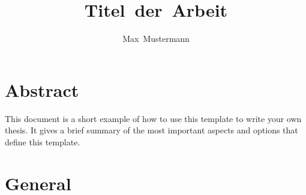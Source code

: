 \documentclass[seminarpaper, grey, english]{mas-thesis-sections}   %
\author{Max~Mustermann}						%
\title{Titel~der~Arbeit}
\begin{document}
\maketitle				%

%
%
\makelicensepageCCBYSA

\cleardoublepage
{}
%
\tableofcontents		%
\newpage
\listofillustrations	%


\cleardoublepage

\newpage
\begingroup %
	\let\clearpage\relax
	\printglossaries
\endgroup

\setcounter{page}{1}


% 
% 
% 
% 
% 
% 




\section*{Abstract}
{}%

This document is a short example of how to use this template to write your own thesis. It gives a brief summary of the most important aspects and options that define this template.



\section{General}
\end{document}
